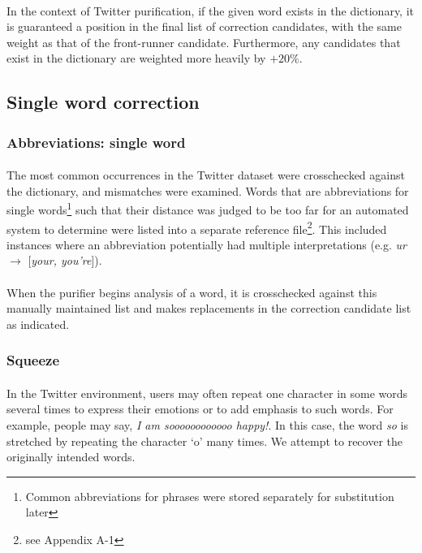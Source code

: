 \documentclass[twocolumn,10pt]{article}
\begin{document}
\paragraph{} In the context of Twitter purification, if the given word exists in the dictionary, it is guaranteed a position in the final list of correction candidates, with the same weight as that of the front-runner candidate. Furthermore, any candidates that exist in the dictionary are weighted more heavily by $+20\%$.
\subsection*{Single word correction}
\subsubsection*{Abbreviations: single word}
\paragraph{} The most common occurrences in the Twitter dataset were crosschecked against the dictionary, and mismatches were examined. Words that are abbreviations for single words\footnote{Common abbreviations for phrases were stored separately for substitution later} such that their distance was judged to be too far for an automated system to determine were listed into a separate reference file\footnote{see Appendix A-1}. This included instances where an abbreviation potentially had multiple interpretations (e.g. \textit{ur} $\rightarrow$ [\textit{your, you're}]).
\paragraph{} When the purifier begins analysis of a word, it is crosschecked against this manually maintained list and makes replacements in the correction candidate list as indicated.
\subsubsection*{Squeeze}
\paragraph{} In the Twitter environment, users may often repeat one character in some words several times to express their emotions or to add emphasis to such words. For example, people may say, \textit{I am soooooooooooo happy!}. In this case, the word \textit{so} is stretched by repeating the character `o' many times. We attempt to recover the originally intended words.
\end{document}
